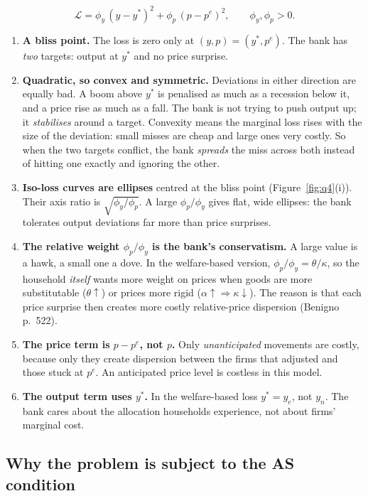 \documentclass[11pt, a4paper]{article}
\begin{document}
\[
\mathcal L=\phi_y\,(y-y^\ast)^2+\phi_p\,(p-p^e)^2,\qquad \phi_y,\phi_p>0 .
\]
\begin{enumerate}[label=\arabic*.]
\item \textbf{A bliss point.} The loss is zero only at $(y,p)=(y^\ast,p^e)$. The bank has
      \emph{two} targets: output at $y^\ast$ and no price surprise.
\item \textbf{Quadratic, so convex and symmetric.} Deviations in either direction are
      equally bad. A boom above $y^\ast$ is penalised as much as a recession below it, and
      a price rise as much as a fall. The bank is not trying to push output up; it
      \emph{stabilises} around a target. Convexity means the marginal loss rises with the
      size of the deviation: small misses are cheap and large ones very costly. So when the
      two targets conflict, the bank \emph{spreads} the miss across both instead of hitting
      one exactly and ignoring the other.
\item \textbf{Iso-loss curves are ellipses} centred at the bliss point
      (Figure~\ref{fig:q4}(i)). Their axis ratio is $\sqrt{\phi_y/\phi_p}$. A large
      $\phi_p/\phi_y$ gives flat, wide ellipses: the bank tolerates output deviations far
      more than price surprises.
\item \textbf{The relative weight $\phi_p/\phi_y$ is the bank's conservatism.} A large value
      is a hawk, a small one a dove. In the welfare-based version,
      $\phi_p/\phi_y=\theta/\kappa$, so the household \emph{itself} wants more weight on
      prices when goods are more substitutable ($\theta\uparrow$) or prices more rigid
      ($\alpha\uparrow\Rightarrow\kappa\downarrow$). The reason is that each price surprise
      then creates more costly relative-price dispersion (Benigno p.~522).
\item \textbf{The price term is $p-p^e$, not $p$.} Only \emph{unanticipated} movements are
      costly, because only they create dispersion between the firms that adjusted and those
      stuck at $p^e$. An anticipated price level is costless in this model.
\item \textbf{The output term uses $y^\ast$.} In the welfare-based loss $y^\ast=y_e$, not
      $y_n$. The bank cares about the allocation households experience, not about firms'
      marginal cost.
\end{enumerate}

\subsection*{Why the problem is subject to the AS condition}
\end{document}

